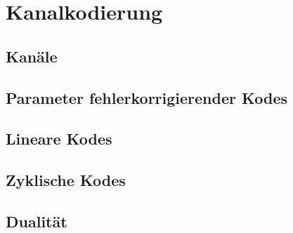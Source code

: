 \documentclass[12pt,a4paper]{scrartcl}
\begin{document}
    \section{Kanalkodierung}
        \subsection{Kanäle}
        \subsection{Parameter fehlerkorrigierender Kodes}
        \subsection{Lineare Kodes}
        \subsection{Zyklische Kodes}
        \subsection{Dualität}
\end{document}
